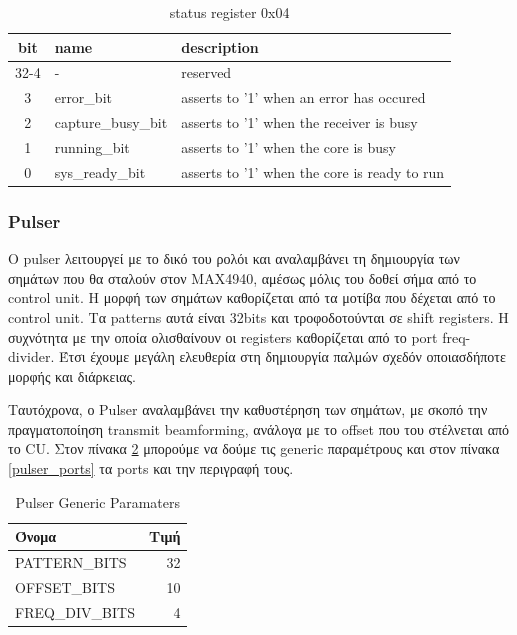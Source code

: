 \documentclass[12pt,a4paper]{book}
\begin{document}
\begin{table}
\begin{tabularx}{\linewidth}{|c|l|X|}
\hline 
bit & name & description \\
\hline
\hline
32-4 & - & reserved \\
\hline
3 & error_bit & asserts to '1' when an error has occured  \\
\hline
2 &  capture_busy_bit & asserts to '1' when the receiver is busy\\
\hline
1 & running_bit & asserts to '1' when the core is busy\\
\hline
0 & sys_ready_bit & asserts to '1' when the core is ready to run \\
\hline
\end{tabularx} 
\caption{status register 0x04}
\label{status_reg} 
\end{table} 




\newpage
\subsubsection{Pulser}
O pulser λειτουργεί με το δικό του ρολόι και αναλαμβάνει τη δημιουργία των σημάτων που θα σταλούν στον MAX4940, αμέσως μόλις του δοθεί σήμα από το control unit. Η μορφή των σημάτων καθορίζεται από τα μοτίβα που δέχεται από το control unit. Τα patterns αυτά είναι 32bits και τροφοδοτούνται σε shift registers. Η συχνότητα με την οποία ολισθαίνουν οι registers καθορίζεται από το port freq-divider. Έτσι έχουμε μεγάλη ελευθερία στη δημιουργία παλμών σχεδόν οποιασδήποτε μορφής και διάρκειας.


Ταυτόχρονα, ο Pulser  αναλαμβάνει την καθυστέρηση των σημάτων, με σκοπό την πραγματοποίηση transmit beamforming, ανάλογα με το offset που του στέλνεται από το CU. Στον πίνακα \ref{pulser_generics} μπορούμε να δούμε τις generic παραμέτρους και στον πίνακα \ref{pulser_ports} τα ports  και την περιγραφή τους.

\begin{table}
\center
\begin{tabular}{|l|r|}
\hline 
Όνομα & Τιμή \\ 
\hline 
\hline 
PATTERN\_BITS & 32 \\ 
\hline 
OFFSET\_BITS & 10 \\ 
\hline 
FREQ\_DIV\_BITS & 4 \\ 
\hline 
\end{tabular} 
\caption{Pulser Generic Paramaters}
\label{pulser_generics} 
\end{table} 
\end{document}
